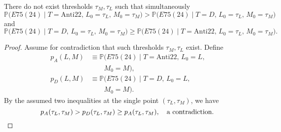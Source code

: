 ﻿\begin{theorem}\label{thm:impossible-thresholds}
There do not exist thresholds \(\tau_M,\tau_L\) such that simultaneously
\[
\mathbb{P}\bigl(E75(24)\mid T=\mathrm{Anti22},\,L_0=\tau_L,\,M_0=\tau_M\bigr)
> \mathbb{P}\bigl(E75(24)\mid T=D,\,L_0=\tau_L,\,M_0=\tau_M\bigr)
\]
and
\[
\mathbb{P}\bigl(E75(24)\mid T=D,\,L_0=\tau_L,\,M_0=\tau_M\bigr)
\ge \mathbb{P}\bigl(E75(24)\mid T=\mathrm{Anti22},\,L_0=\tau_L,\,M_0=\tau_M\bigr).
\]
\end{theorem}
\begin{proof}
Assume for contradiction that such thresholds \(\tau_M,\tau_L\) exist. Define
\[
\begin{aligned}
 p_A(L,M) &\equiv \mathbb{P}\bigl(E75(24)\mid T=\mathrm{Anti22},\,L_0=L,\\[-2pt]
 &\qquad M_0=M\bigr),\\
 p_D(L,M) &\equiv \mathbb{P}\bigl(E75(24)\mid T=D,\,L_0=L,\\[-2pt]
 &\qquad M_0=M\bigr).
\end{aligned}
\]
By the assumed two inequalities at the single point \((\tau_L,\tau_M)\), we have
\[
 p_A(\tau_L,\tau_M) > p_D(\tau_L,\tau_M) \ge p_A(\tau_L,\tau_M),\quad \text{a contradiction.}\;\qedhere
\]
\end{proof}

